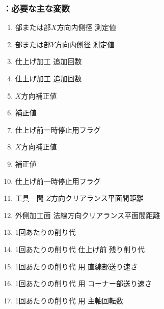 \clearpage
\subsubsection{\KEndFaceInCChamferRLeft：必要な主な変数}
\begin{enumerate}[label*=\sarrow]
\item \TopEndFace 部または\BottomEndFace 部$X$方向内側径 測定値
\item \TopEndFace 部または\BottomEndFace 部$Y$方向内側径 測定値
\item \TopEndFaceInCChamfer{} 仕上げ加工 追加回数
\item \BottomEndFaceInCChamfer{} 仕上げ加工 追加回数
\item \TopEndFaceInCChamfer$X$方向補正値
\item \TopEndFaceInCChamferWidth 補正値
\item \TopEndFaceInCChamfer{} 仕上げ前一時停止用フラグ
\item \BottomEndFaceInCChamfer$X$方向補正値
\item \BottomEndFaceInCChamferWidth 補正値
\item \BottomEndFaceInCChamfer{} 仕上げ前一時停止用フラグ
\item 工具 - \EndFace 間 $Z$方向クリアランス平面間距離
\item 外側加工面 法線方向クリアランス平面間距離
\item \EndFaceInCChamferMilling1回あたりの削り代
\item \EndFaceInCChamferMilling1回あたりの削り代{} 仕上げ前 残り削り代
\item \EndFaceInCChamferMilling1回あたりの削り代 用 直線部送り速さ
\item \EndFaceInCChamferMilling1回あたりの削り代 用 コーナー部送り速さ
\item \EndFaceInCChamferMilling1回あたりの削り代 用 主軸回転数
\end{enumerate}



